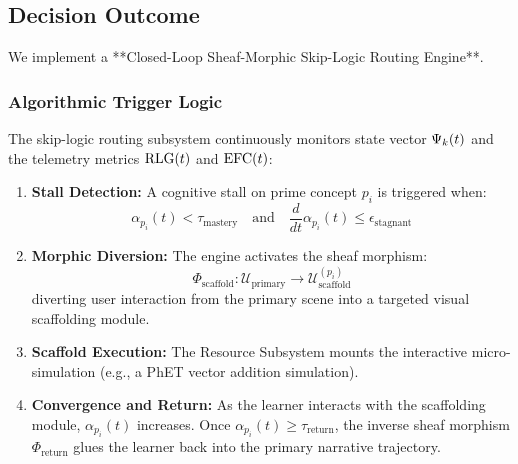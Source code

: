 \subsection{Decision Outcome}
We implement a **Closed-Loop Sheaf-Morphic Skip-Logic Routing Engine**.

\subsubsection{Algorithmic Trigger Logic}
The skip-logic routing subsystem continuously monitors state vector $\Psi_k(t)$ and the telemetry metrics $\mathrm{RLG}(t)$ and $\mathrm{EFC}(t)$:
\begin{enumerate}
    \item \textbf{Stall Detection:} A cognitive stall on prime concept $p_i$ is triggered when:
    \begin{equation}
    \alpha_{p_i}(t) < \tau_{\text{mastery}} \quad \text{and} \quad \frac{d}{dt}\alpha_{p_i}(t) \le \epsilon_{\text{stagnant}}
    \end{equation}
    \item \textbf{Morphic Diversion:} The engine activates the sheaf morphism:
    \begin{equation}
    \Phi_{\text{scaffold}}: \mathcal{U}_{\text{primary}} \longrightarrow \mathcal{U}_{\text{scaffold}}^{(p_i)}
    \end{equation}
    diverting user interaction from the primary scene into a targeted visual scaffolding module.
    \item \textbf{Scaffold Execution:} The Resource Subsystem mounts the interactive micro-simulation (e.g., a PhET vector addition simulation).
    \item \textbf{Convergence and Return:} As the learner interacts with the scaffolding module, $\alpha_{p_i}(t)$ increases. Once $\alpha_{p_i}(t) \ge \tau_{\text{return}}$, the inverse sheaf morphism $\Phi_{\text{return}}$ glues the learner back into the primary narrative trajectory.
\end{enumerate}

